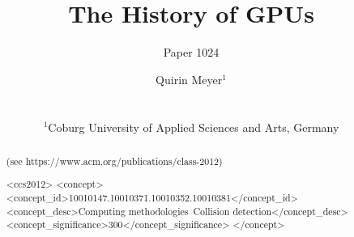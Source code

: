 \documentclass{download/egPublStyle-cgf/egpubl}
\author[Paper 1024]{\parbox{\textwidth}{\centering Paper 1024}}
\author[Kuth et al.]
    {\parbox{\textwidth}{\centering             
            Quirin Meyer$^1$\orcid{0000-0001-7073-442X}      		      		                
            }
            \\
            {
                \parbox{\textwidth}
                {
                    \centering $^1$Coburg University of Applied Sciences and Arts, Germany 
                }
            }
    }
\title{The History of \Acsp{GPU}}
\begin{document}
\teaser
{
    
}
\maketitle
\begin{abstract}

(see https://www.acm.org/publications/class-2012)
\begin{CCSXML}
<ccs2012>
<concept>
<concept_id>10010147.10010371.10010352.10010381</concept_id>
<concept_desc>Computing methodologies~Collision detection</concept_desc>
<concept_significance>300</concept_significance>
</concept>
\end{CCSXML}

\printccsdesc 
\end{abstract}

 


\end{document}
